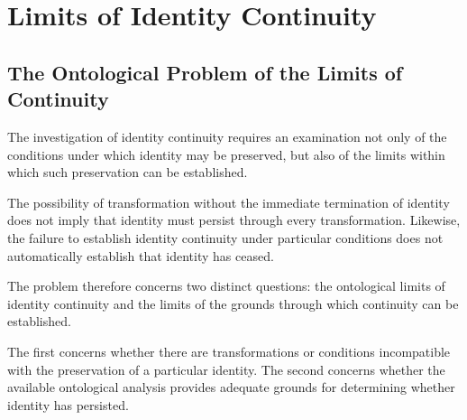 %
%

\section{Limits of Identity Continuity}
\label{sec:limits-of-identity-continuity}

\subsection{The Ontological Problem of the Limits of Continuity}

The investigation of identity continuity requires an
examination not only of the conditions under which
identity may be preserved, but also of the limits
within which such preservation can be established.

The possibility of transformation without the immediate
termination of identity does not imply that identity
must persist through every transformation. Likewise,
the failure to establish identity continuity under
particular conditions does not automatically establish
that identity has ceased.

The problem therefore concerns two distinct questions:
the ontological limits of identity continuity and the
limits of the grounds through which continuity can
be established.

The first concerns whether there are transformations
or conditions incompatible with the preservation
of a particular identity. The second concerns whether
the available ontological analysis provides adequate
grounds for determining whether identity has persisted.

